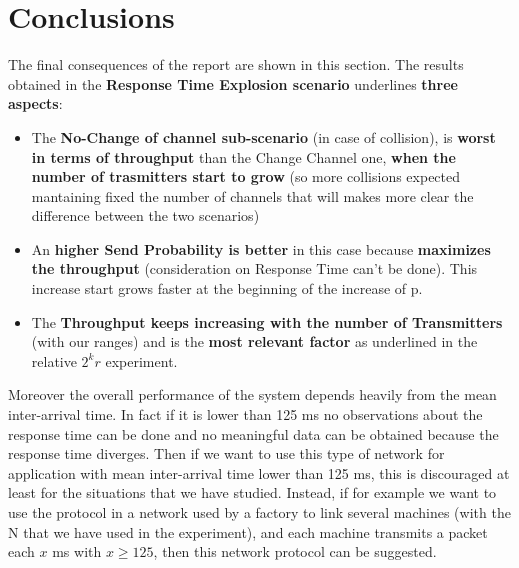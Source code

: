 \section{Conclusions}
The final consequences of the report are shown in this section. 
The results obtained in the \textbf{Response Time Explosion scenario} underlines \textbf{three aspects}:
\begin{itemize}
	\item The \textbf{No-Change of channel sub-scenario} (in case of collision), is \textbf{worst in terms of throughput} than the Change Channel one, \textbf{when the number of trasmitters start to grow} (so more collisions expected mantaining fixed the number of channels that will makes more clear the difference between the two scenarios)
	\item An \textbf{higher Send Probability is better} in this case because \textbf{maximizes the throughput} (consideration on Response Time can't be done). This increase start grows faster at the beginning of the increase of p. 
	\item The \textbf{Throughput keeps increasing with the number of Transmitters} (with our ranges) and is the \textbf{most relevant factor} as underlined in the relative $2^{k}r$ experiment.
\end{itemize} 

\noindent %

\noindent Moreover the overall performance of the system depends heavily from the mean inter-arrival time. In fact if it is lower than 125 ms no observations about the response time can be done and no meaningful data can be obtained because the response time diverges. Then if we want to use this type of network for application with mean inter-arrival time lower than 125 ms, this is discouraged at least for the situations that we have studied. Instead, if for example we want to use the protocol in a network used by a factory to link several machines (with the N that we have used in the experiment), and each machine transmits a packet each $x$ ms with $x\ge125$, then this network protocol can be suggested.


